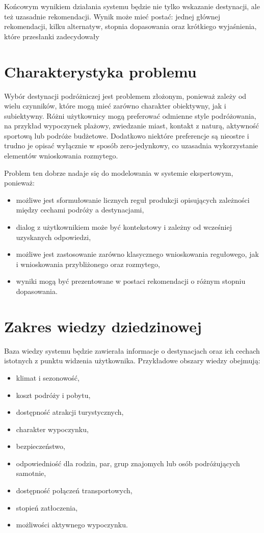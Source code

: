 \documentclass[12pt,a4paper]{article}
\begin{document}
Końcowym wynikiem działania systemu będzie nie tylko wskazanie destynacji, ale też uzasadnie rekomendacji.  
Wynik może mieć postać:
jednej głównej rekomendacji,
kilku alternatyw,
stopnia dopasowania oraz
krótkiego wyjaśnienia, które przesłanki zadecydowały

\section{Charakterystyka problemu}

Wybór destynacji podróżniczej jest problemem złożonym, ponieważ zależy od wielu czynników, które mogą mieć zarówno charakter obiektywny, jak i subiektywny. Różni użytkownicy mogą preferować odmienne style podróżowania, na przykład wypoczynek plażowy, zwiedzanie miast, kontakt z naturą, aktywność sportową lub podróże budżetowe. Dodatkowo niektóre preferencje są nieostre i trudno je opisać wyłącznie w sposób zero-jedynkowy, co uzasadnia wykorzystanie elementów wnioskowania rozmytego.

Problem ten dobrze nadaje się do modelowania w systemie ekspertowym, ponieważ:
\begin{itemize}
    \item możliwe jest sformułowanie licznych reguł produkcji opisujących zależności między cechami podróży a destynacjami,
    \item dialog z użytkownikiem może być kontekstowy i zależny od wcześniej uzyskanych odpowiedzi,
    \item możliwe jest zastosowanie zarówno klasycznego wnioskowania regułowego, jak i wnioskowania przybliżonego oraz rozmytego,
    \item wyniki mogą być prezentowane w postaci rekomendacji o różnym stopniu dopasowania.
\end{itemize}

\section{Zakres wiedzy dziedzinowej}

Baza wiedzy systemu będzie zawierała informacje o destynacjach oraz ich cechach istotnych z punktu widzenia użytkownika. Przykładowe obszary wiedzy obejmują:
\begin{itemize}
    \item klimat i sezonowość,
    \item koszt podróży i pobytu,
    \item dostępność atrakcji turystycznych,
    \item charakter wypoczynku,
    \item bezpieczeństwo,
    \item odpowiedniość dla rodzin, par, grup znajomych lub osób podróżujących samotnie,
    \item dostępność połączeń transportowych,
    \item stopień zatłoczenia,
    \item możliwości aktywnego wypoczynku.
\end{itemize}
\end{document}
